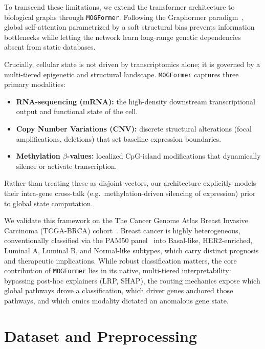 \documentclass[10pt, twocolumn]{article}
\begin{document}
To transcend these limitations, we extend the transformer architecture to
biological graphs through \texttt{MOGFormer}. Following the Graphormer
paradigm~\cite{ying2021graphormer}, global self-attention parametrized by a soft
structural bias prevents information bottlenecks while letting the network learn
long-range genetic dependencies absent from static databases.

Crucially, cellular state is not driven by transcriptomics alone; it is governed
by a multi-tiered epigenetic and structural landscape. \texttt{MOGFormer}
captures three primary modalities:
\begin{itemize}
    \item \textbf{RNA-sequencing (mRNA):} the high-density downstream
    transcriptional output and functional state of the cell.
    \item \textbf{Copy Number Variations (CNV):} discrete structural alterations
    (focal amplifications, deletions) that set baseline expression boundaries.
    \item \textbf{Methylation $\beta$-values:} localized CpG-island modifications
    that dynamically silence or activate transcription.
\end{itemize}
Rather than treating these as disjoint vectors, our architecture explicitly models
their intra-gene cross-talk (e.g.\ methylation-driven silencing of expression)
prior to global state computation.

We validate this framework on the The Cancer Genome Atlas Breast Invasive
Carcinoma (TCGA-BRCA) cohort~\cite{tcga2012brca}. Breast cancer is highly
heterogeneous, conventionally classified via the PAM50
panel~\cite{parker2009pam50} into Basal-like, HER2-enriched, Luminal A, Luminal B,
and Normal-like subtypes, which carry distinct prognosis and therapeutic
implications. While robust classification matters, the core contribution of
\texttt{MOGFormer} lies in its native, multi-tiered interpretability: bypassing
post-hoc explainers (LRP, SHAP), the routing mechanics expose which global
pathways drove a classification, which driver genes anchored those pathways, and
which omics modality dictated an anomalous gene state.

\section{Dataset and Preprocessing}
\end{document}
